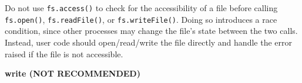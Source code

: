 \begin{Shaded}
\begin{Highlighting}[]
\OperatorTok{,} \OperatorTok{|}\OperatorTok{,}\KeywordTok{=\textgreater{}}\NormalTok{ \{}
  \NormalTok{(}\VerbatimStringTok{\textasciigrave{}}\SpecialCharTok{$\{}\SpecialCharTok{\}}\VerbatimStringTok{ }\SpecialCharTok{$\{}  \OperatorTok{:} \SpecialCharTok{\}}\NormalTok{)}\OperatorTok{;}
\NormalTok{\})}\OperatorTok{;}
\end{Highlighting}
\end{Shaded}

Do not use \texttt{fs.access()} to check for the accessibility of a file
before calling \texttt{fs.open()}, \texttt{fs.readFile()}, or
\texttt{fs.writeFile()}. Doing so introduces a race condition, since
other processes may change the file's state between the two calls.
Instead, user code should open/read/write the file directly and handle
the error raised if the file is not accessible.

\textbf{write (NOT RECOMMENDED)}

